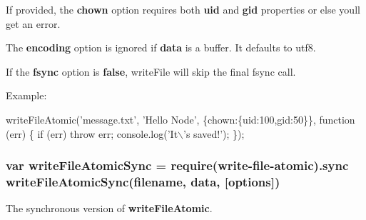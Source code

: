 If provided, the {\bfseries chown} option requires both {\bfseries uid} and {\bfseries gid} properties or else you\textquotesingle{}ll get an error.

The {\bfseries encoding} option is ignored if {\bfseries data} is a buffer. It defaults to \textquotesingle{}utf8\textquotesingle{}.

If the {\bfseries fsync} option is {\bfseries false}, write\+File will skip the final fsync call.

Example\+:


\begin{DoxyCode}
writeFileAtomic('message.txt', 'Hello Node', \{chown:\{uid:100,gid:50\}\}, function (err) \{
  if (err) throw err;
  console.log('It\(\backslash\)'s saved!');
\});
\end{DoxyCode}


\subsubsection*{var write\+File\+Atomic\+Sync = require(\textquotesingle{}write-\/file-\/atomic\textquotesingle{}).sync~\newline
write\+File\+Atomic\+Sync(filename, data, \mbox{[}options\mbox{]})}

The synchronous version of {\bfseries write\+File\+Atomic}. 